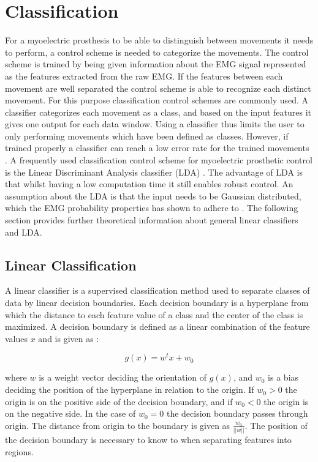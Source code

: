\section{Classification} \label{sec:BG:classification}
For a myoelectric prosthesis to be able to distinguish between movements it needs to perform, a control scheme is needed to categorize the movements. The control scheme is trained by being given information about the EMG signal represented as the features extracted from the raw EMG. If the features between each movement are well separated the control scheme is able to recognize each distinct movement. For this purpose classification control schemes are commonly used. A classifier categorizes each movement as a class, and based on the input features it gives one output for each data window. Using a classifier thus limits the user to only performing movements which have been defined as classes. However, if trained properly a classifier can reach a low error rate for the trained movements \cite{Scheme2013}. A frequently used classification control scheme for myoelectric prosthetic control is the Linear Discriminant Analysis classifier (LDA) \cite{Englehart2003, Scheme2015, Fang2017, Scheme2013}. The advantage of LDA is that whilst having a low computation time it still enables robust control. An assumption about the LDA is that the input needs to be Gaussian distributed, which the EMG probability properties has shown to adhere to \cite{Duda2000, Nazarpour2013}. The following section provides further theoretical information about general linear classifiers and LDA.


\subsection{Linear Classification} \label{sub:BG:linearClassification}
A linear classifier is a supervised classification method used to separate classes of data by linear decision boundaries. Each decision boundary is a hyperplane from which the distance to each feature value of a class and the center of the class is maximized. A decision boundary is defined as a linear combination of the feature values $x$ and is given as \cite{Duda2000}:

\begin{equation}
g(x) = w^tx +w_0
\end{equation}

where $w$ is a weight vector deciding the orientation of $g(x)$, and $w_0$ is a bias deciding the position of the hyperplane in relation to the origin. If $w_0 > 0$ the origin is on the positive side of the decision boundary, and if $w_0 < 0$ the origin is on the negative side. In the case of $w_0 = 0$ the decision boundary passes through origin. The distance from origin to the boundary is given as $\frac{w_0}{||w||}$. The position of the decision boundary is necessary to know to when separating features into regions. \cite{Duda2000}

